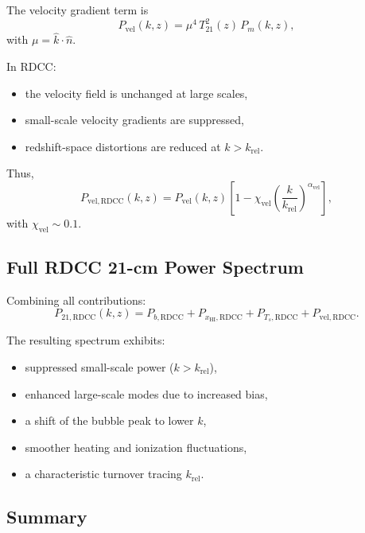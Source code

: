 \documentclass[11pt,a4paper]{article}
\begin{document}
The velocity gradient term is
\begin{equation}
P_{\mathrm{vel}}(k,z)
=
\mu^{4}\,
T_{21}^{2}(z)\,
P_{m}(k,z),
\end{equation}
with $\mu = \hat{k}\cdot\hat{n}$.

In RDCC:
\begin{itemize}
\item the velocity field is unchanged at large scales,
\item small-scale velocity gradients are suppressed,
\item redshift-space distortions are reduced at $k > k_{\mathrm{rel}}$.
\end{itemize}

Thus,
\begin{equation}
P_{\mathrm{vel,RDCC}}(k,z)
=
P_{\mathrm{vel}}(k,z)
\left[
1
-
\chi_{\mathrm{vel}}
\left(
\frac{k}{k_{\mathrm{rel}}}
\right)^{\alpha_{\mathrm{vel}}}
\right],
\end{equation}
with $\chi_{\mathrm{vel}} \sim 0.1$.

\subsection{Full RDCC 21-cm Power Spectrum}

Combining all contributions:
\begin{equation}
P_{21,\mathrm{RDCC}}(k,z)
=
P_{b,\mathrm{RDCC}}
+
P_{x_{\mathrm{HI}},\mathrm{RDCC}}
+
P_{T_{s},\mathrm{RDCC}}
+
P_{\mathrm{vel,RDCC}}.
\end{equation}

The resulting spectrum exhibits:
\begin{itemize}
\item suppressed small-scale power ($k > k_{\mathrm{rel}}$),
\item enhanced large-scale modes due to increased bias,
\item a shift of the bubble peak to lower $k$,
\item smoother heating and ionization fluctuations,
\item a characteristic turnover tracing $k_{\mathrm{rel}}$.
\end{itemize}

\subsection{Summary}
\end{document}

